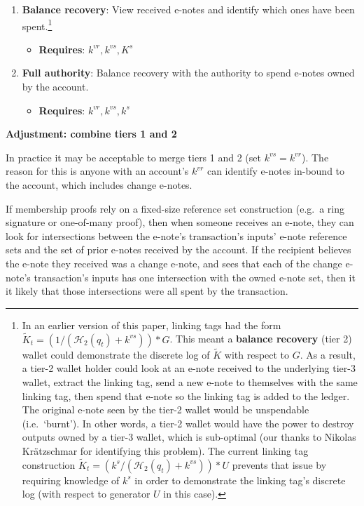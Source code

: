 \begin{itemize}
\begin{enumerate}
        \item \textbf{Balance recovery}: View received e-notes and identify which ones have been spent.\footnote{In an earlier version of this paper, linking tags had the form $\tilde{K}_t = (1/(\mathcal{H}_2(q_t) + k^{vs}))*G$. This meant a \textbf{balance recovery} (tier 2) wallet could demonstrate the discrete log of $\tilde{K}$ with respect to $G$. As a result, a tier-2 wallet holder could look at an e-note received to the underlying tier-3 wallet, extract the linking tag, send a new e-note to themselves with the same linking tag, then spend that e-note so the linking tag is added to the ledger. The original e-note seen by the tier-2 wallet would be unspendable (i.e.\ `burnt'). In other words, a tier-2 wallet would have the power to destroy outputs owned by a tier-3 wallet, which is sub-optimal (our thanks to Nikolas Kr{\"{a}}tzschmar for identifying this problem). The current linking tag construction $\tilde{K}_t = (k^s/(\mathcal{H}_2(q_t) + k^{vs}))*U$ prevents that issue by requiring knowledge of $k^s$ in order to demonstrate the linking tag's discrete log (with respect to generator $U$ in this case).}
        \begin{itemize}
            \item \textbf{Requires}: $k^{vr}, k^{vs}, K^s$
        \end{itemize}

        \item \textbf{Full authority}: Balance recovery with the authority to spend e-notes owned by the account.
        \begin{itemize}
            \item \textbf{Requires}: $k^{vr}, k^{vs}, k^s$
        \end{itemize}
    \end{enumerate}
\end{itemize}

\textbf{Adjustment: combine tiers 1 and 2}

In practice it may be acceptable to merge tiers 1 and 2 (set $k^{vs} = k^{vr}$). The reason for this is anyone with an account's $k^{vr}$ can identify e-notes in-bound to the account, which includes change e-notes.

If membership proofs rely on a fixed-size reference set construction (e.g.\ a ring signature or one-of-many proof), then when someone receives an e-note, they can look for intersections between the e-note's transaction's inputs' e-note reference sets and the set of prior e-notes received by the account. If the recipient believes the e-note they received was a change e-note, and sees that each of the change e-note's transaction's inputs has one intersection with the owned e-note set, then it it likely that those intersections were all spent by the transaction.

